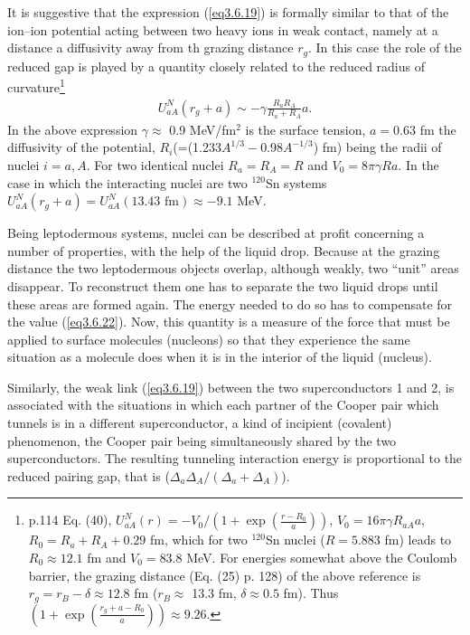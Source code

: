  
 It is suggestive that the expression (\ref{eq3.6.19}) is formally similar to that of the ion--ion potential acting between two heavy ions in weak contact, namely at a distance  a diffusivity away from th grazing distance $r_g$. In this case the role of the reduced gap is played by a quantity closely related to the reduced radius of curvature\footnote{\cite{Broglia:04a} p.114  Eq. (40), $U_{aA}^{N}(r)=-V_0/(1+\exp(\frac{r-R_0}{a}))$, $V_0=16\pi\gamma R_{aA}a$, $R_0=R_a+R_A+0.29$ fm, which for two $^{120}$Sn nuclei ($R=5.883$ fm) leads to $R_0\approx12.1$ fm and $V_0=83.8$ MeV. For energies somewhat above the Coulomb barrier, the grazing distance (Eq. (25) p. 128) of the above reference is $r_g=r_B-\delta\approx12.8$ fm ($r_B\approx$ 13.3 fm, $\delta\approx0.5$ fm). Thus $(1+\exp(\frac{r_g+a-R_0}{a}))\approx9.26$.}
 \begin{align}\label{eq3.6.22}
 U_{aA}^N(r_g+a)\sim -\gamma\frac{R_aR_A}{R_a+R_A}a.
 \end{align}
 In the above expression $\gamma\approx$ 0.9 MeV/fm$^2$ is the surface tension, $a=0.63$ fm the diffusivity of the potential, $R_i$(=(1.233$A^{1/3}-0.98A^{-1/3}$) fm) being the radii of nuclei $i=a,A$. For two identical nuclei $R_a=R_A=R$ and $V_0=8\pi\gamma R a$. In the case in which the interacting nuclei are two  $^{120}$Sn systems  $U_{aA}^N(r_g+a)=U_{aA}^N(13.43 \text{ fm})\approx-9.1$ MeV.
 
 
 
Being leptodermous systems, nuclei can be described at profit concerning a number of properties, with the help of the liquid drop. Because at the grazing distance the two leptodermous objects overlap, although weakly, two ``unit'' areas disappear. To reconstruct them one has to separate the two liquid drops until these areas are formed again. The energy needed to do so has to compensate for the value (\ref{eq3.6.22}).  Now, this quantity is a measure of the force that must be applied to surface molecules (nucleons) so that they experience the same situation as a molecule does when it is in the interior of the liquid (nucleus). 
  
   
 Similarly, the weak link (\ref{eq3.6.19}) between the two superconductors 1 and 2, is associated with the situations in which each partner of the Cooper pair which tunnels is in a different superconductor, a kind of incipient (covalent) phenomenon, the Cooper pair being simultaneously shared by the two superconductors. The resulting tunneling interaction energy is proportional to the reduced pairing gap, that is ($\Delta_a\Delta_A/(\Delta_a+\Delta_A)$). 
